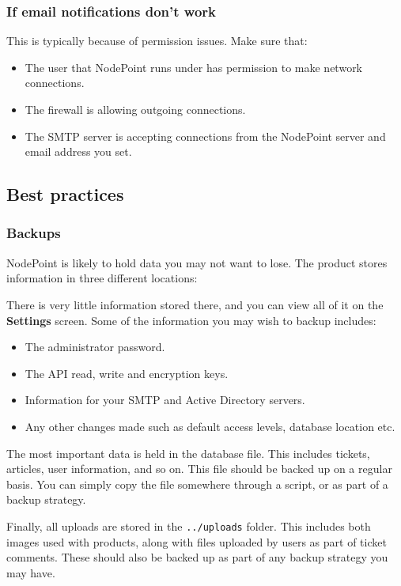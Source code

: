\documentclass[11pt]{article}
\begin{document}
\subsubsection{If email notifications don't work}

This is typically because of permission issues. Make sure that:
\begin{itemize}
\item The user that NodePoint runs under has permission to make network connections.
\item The firewall is allowing outgoing connections.
\item The SMTP server is accepting connections from the NodePoint server and email address you set.
\end{itemize}

\subsection{Best practices}
\subsubsection{Backups}
NodePoint is likely to hold data you may not want to lose. The product stores information in three different locations:

 There is very little information stored there, and you can view all of it on the \textbf{Settings} screen. Some of the information you may wish to backup includes:

\begin{itemize}
\item The administrator password.
\item The API read, write and encryption keys.
\item Information for your SMTP and Active Directory servers.
\item Any other changes made such as default access levels, database location etc.
\end{itemize}

The most important data is held in the database file. This includes tickets, articles, user information, and so on. This file should be backed up on a regular basis. You can simply copy the file somewhere through a script, or as part of a backup strategy.

Finally, all uploads are stored in the \texttt{../uploads} folder. This includes both images used with products, along with files uploaded by users as part of ticket comments. These should also be backed up as part of any backup strategy you may have.
\end{document}
